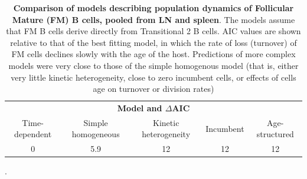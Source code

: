 \documentclass[11pt]{article}
\newcommand{\khi}{Ki67$^\text{hi}$}
\newcommand{\klo}{Ki67$^\text{lo}$}
\begin{document}


\begin{table}[h!]
	\begin{center}
		\renewcommand{\arraystretch}{1.25}
		\begin{tabular}{c c c c c} 
			\toprule 
			 \multicolumn{5}{c}{\textbf{Model and $\Delta$AIC}} \\
			\cline{1-5}
			 {\small Time-dependent}  & {\small Simple homogeneous} &  {\small Kinetic heterogeneity} & {\small Incumbent}  & {\small Age-structured} \\ 
			\toprule
			 0      &  5.9  & 12 & 12  &  12  \\ 
			\hline
			\toprule 
		\end{tabular}
	\end{center}
	\caption{\small \textbf{Comparison of models describing population dynamics of Follicular Mature (FM) B cells, pooled from LN and spleen}. The models assume that FM B cells derive directly from Transitional 2 B cells. AIC values are shown relative to that of the best fitting model, in which the rate of loss  (turnover) of FM cells declines slowly with the age of the host. Predictions of more complex models were very close to those of the simple homogenous model (that is, either very little kinetic heterogeneity, close to zero incumbent cells, or effects of cells age on turnover or division rates)}. 
	\label{tab:FM-AICs}
\end{table} 
\end{document}
